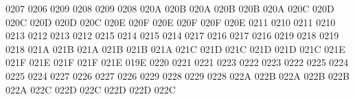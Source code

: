  0207 0206 %
 0209 0208 %
 0209 0208 %
\setcclcucx 020A 020B 020A %
\setcclcucx 020B 020B 020A %
\setcclcucx 020C 020D 020C %
\setcclcucx 020D 020D 020C %
\setcclcucx 020E 020F 020E %
\setcclcucx 020F 020F 020E %
 0211 0210 %
 0211 0210 %
 0213 0212 %
 0213 0212 %
 0215 0214 %
 0215 0214 %
 0217 0216 %
 0217 0216 %
 0219 0218 %
 0219 0218 %
\setcclcucx 021A 021B 021A %
\setcclcucx 021B 021B 021A %
\setcclcucx 021C 021D 021C %
\setcclcucx 021D 021D 021C %
\setcclcucx 021E 021F 021E %
\setcclcucx 021F 021F 021E %
 019E 0220 %
 0221 0221 %
 0223 0222 %
 0223 0222 %
 0225 0224 %
 0225 0224 %
 0227 0226 %
 0227 0226 %
 0229 0228 %
 0229 0228 %
\setcclcucx 022A 022B 022A %
\setcclcucx 022B 022B 022A %
\setcclcucx 022C 022D 022C %
\setcclcucx 022D 022D 022C %
